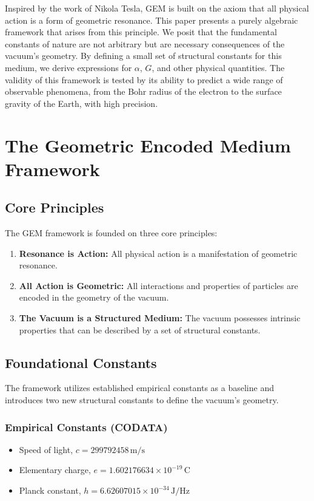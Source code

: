 \documentclass[12pt]{article}
\begin{document}
Inspired by the work of Nikola Tesla, GEM is built on the axiom that all physical action is a form of geometric resonance. This paper presents a purely algebraic framework that arises from this principle. We posit that the fundamental constants of nature are not arbitrary but are necessary consequences of the vacuum's geometry. By defining a small set of structural constants for this medium, we derive expressions for $\alpha$, $G$, and other physical quantities. The validity of this framework is tested by its ability to predict a wide range of observable phenomena, from the Bohr radius of the electron to the surface gravity of the Earth, with high precision.

\section{The Geometric Encoded Medium Framework}

\subsection{Core Principles}

The GEM framework is founded on three core principles:
\begin{enumerate}
    \item \textbf{Resonance is Action:} All physical action is a manifestation of geometric resonance.
    \item \textbf{All Action is Geometric:} All interactions and properties of particles are encoded in the geometry of the vacuum.
    \item \textbf{The Vacuum is a Structured Medium:} The vacuum possesses intrinsic properties that can be described by a set of structural constants.
\end{enumerate}

\subsection{Foundational Constants}

The framework utilizes established empirical constants as a baseline and introduces two new structural constants to define the vacuum's geometry.

\subsubsection{Empirical Constants (CODATA)}
\begin{itemize}
    \item Speed of light, $c = 299792458 \, \text{m/s}$
    \item Elementary charge, $e = 1.602176634 \times 10^{-19} \, \text{C}$
    \item Planck constant, $h = 6.62607015 \times 10^{-34} \, \text{J/Hz}$
\end{itemize}
\end{document}
